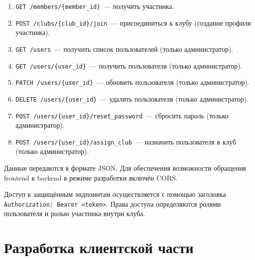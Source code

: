 \documentclass[utf8, russian]{eskdtext}
\let\stdsection\section
\renewcommand \section{\newpage\stdsection}
\begin{document}
\begin{enumerate}
  \item \texttt{GET /members/\{member\_id\}}~--- получить участника.
  \item \texttt{POST /clubs/\{club\_id\}/join}~--- присоединиться к клубу (создание профиля участника).
  \item \texttt{GET /users}~--- получить список пользователей (только администратор).
  \item \texttt{GET /users/\{user\_id\}}~--- получить пользователя (только администратор).
  \item \texttt{PATCH /users/\{user\_id\}}~--- обновить пользователя (только администратор).
  \item \texttt{DELETE /users/\{user\_id\}}~--- удалить пользователя (только администратор).
  \item \texttt{POST /users/\{user\_id\}/reset\_password}~--- сбросить пароль (только администратор).
  \item \texttt{POST /users/\{user\_id\}/assign\_club}~--- назначить пользователя в клуб (только администратор).
\end{enumerate}

Данные передаются в формате JSON. Для обеспечения возможности обращения frontend к backend в режиме разработки включён CORS.

Доступ к защищённым эндпоинтам осуществляется с помощью заголовка \texttt{Authorization: Bearer <token>}. Права доступа определяются ролями пользователя и ролью участника внутри клуба.

\section{Разработка клиентской части}
\end{document}
